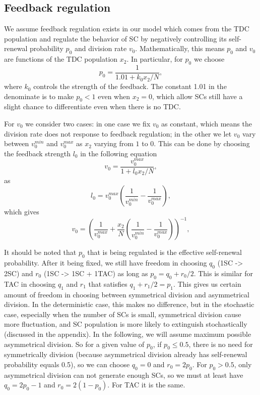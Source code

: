 \documentclass[12pt]{article}
\begin{document}
\subsection*{Feedback regulation}
We assume feedback regulation exists in our model 
which comes from the TDC population and regulate 
the behavior of SC by negatively controlling its 
self-renewal probability $p_0$ and division rate $v_0$. 
Mathematically, this means $p_0$ and $v_0$ are functions
of the TDC population $x_2$. In particular, for $p_0$ we choose
\begin{equation}
p_0 = \frac{1}{1.01+k_0 x_2 / N},
\label{feedp0}
\end{equation}
where $k_0$ controls the strength of the feedback. 
The constant 1.01 in the denominate is to make $p_0<1$ even when $x_2=0$, 
which allow SCs still have a slight chance to differentiate 
even when there is no TDC.

For $v_0$ we consider two cases: in one case we fix $v_0$ as constant,
which means the division rate does not response to feedback regulation;
in the other we let $v_0$ vary between $v_0^{min}$ and $v_0^{max}$
as $x_2$ varying from $1$ to $0$. This can be done by choosing
the feedback strength $l_0$ in the following equation
\begin{equation*}
v_0 = \frac{v_0^{max}}{1+l_0 x_2/N},
\end{equation*}
as
$$
l_0 = v_0^{max}\left( \frac{1}{v_0^{min}} - \frac{1}{v_0^{max}}\right),
$$
which gives
\begin{equation}
v_0 = \left( \frac{1}{v_0^{max}} + \frac{x_2}{N}
\left( \frac{1}{v_0^{min}} - \frac{1}{v_0^{max}}\right) \right)^{-1},
\label{feedv0}
\end{equation}

It should be noted that $p_0$ that is being regulated
is the effective self-renewal probability. After it being
fixed, we still have freedom in choosing 
$q_0$ (1SC -> 2SC) and $r_0$ (1SC -> 1SC + 1TAC)
as long as $p_0 = q_0 + r_0/2$.
This is similar for TAC in choosing $q_1$ and $r_1$ that
satisfies $q_1 + r_1/2 = p_1$.
This gives us certain amount of freedom in 
choosing between symmetrical division 
and asymmetrical division. In the deterministic case, 
this makes no difference, 
but in the stochastic case, especially when the number of SCs is small, 
symmetrical division cause more fluctuation, 
and SC population is more likely to extinguish stochastically 
(discussed in the appendix).
In the following, we will assume maximum possible asymmetrical division. 
So for a given value of $p_0$, if $p_0 \le 0.5$, there is no need for 
symmetrically division (because asymmetrical division already 
has self-renewal probability equals 0.5), so we can choose 
$q_0=0$ and $r_0 = 2p_0$.
For $p_0>0.5$, only asymmetrical division can 
not generate enough SCs, so we must at least have 
$q_0 = 2p_0 - 1$ and $r_0 = 2(1-p_0)$. 
For TAC it is the same.
\end{document}
